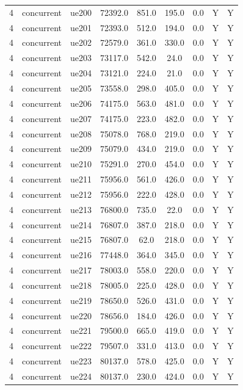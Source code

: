 \begin{table}[ht]
\begin{tabular}{|c|c|c|c|c|c|c|c|c|}
4 & concurrent & ue200 & 72392.0 & 851.0 & 195.0 & 0.0 & Y & Y \\
4 & concurrent & ue201 & 72393.0 & 512.0 & 194.0 & 0.0 & Y & Y \\
4 & concurrent & ue202 & 72579.0 & 361.0 & 330.0 & 0.0 & Y & Y \\
4 & concurrent & ue203 & 73117.0 & 542.0 & 24.0 & 0.0 & Y & Y \\
4 & concurrent & ue204 & 73121.0 & 224.0 & 21.0 & 0.0 & Y & Y \\
4 & concurrent & ue205 & 73558.0 & 298.0 & 405.0 & 0.0 & Y & Y \\
4 & concurrent & ue206 & 74175.0 & 563.0 & 481.0 & 0.0 & Y & Y \\
4 & concurrent & ue207 & 74175.0 & 223.0 & 482.0 & 0.0 & Y & Y \\
4 & concurrent & ue208 & 75078.0 & 768.0 & 219.0 & 0.0 & Y & Y \\
4 & concurrent & ue209 & 75079.0 & 434.0 & 219.0 & 0.0 & Y & Y \\
4 & concurrent & ue210 & 75291.0 & 270.0 & 454.0 & 0.0 & Y & Y \\
4 & concurrent & ue211 & 75956.0 & 561.0 & 426.0 & 0.0 & Y & Y \\
4 & concurrent & ue212 & 75956.0 & 222.0 & 428.0 & 0.0 & Y & Y \\
4 & concurrent & ue213 & 76800.0 & 735.0 & 22.0 & 0.0 & Y & Y \\
4 & concurrent & ue214 & 76807.0 & 387.0 & 218.0 & 0.0 & Y & Y \\
4 & concurrent & ue215 & 76807.0 & 62.0 & 218.0 & 0.0 & Y & Y \\
4 & concurrent & ue216 & 77448.0 & 364.0 & 345.0 & 0.0 & Y & Y \\
4 & concurrent & ue217 & 78003.0 & 558.0 & 220.0 & 0.0 & Y & Y \\
4 & concurrent & ue218 & 78005.0 & 225.0 & 428.0 & 0.0 & Y & Y \\
4 & concurrent & ue219 & 78650.0 & 526.0 & 431.0 & 0.0 & Y & Y \\
4 & concurrent & ue220 & 78656.0 & 184.0 & 426.0 & 0.0 & Y & Y \\
4 & concurrent & ue221 & 79500.0 & 665.0 & 419.0 & 0.0 & Y & Y \\
4 & concurrent & ue222 & 79507.0 & 331.0 & 413.0 & 0.0 & Y & Y \\
4 & concurrent & ue223 & 80137.0 & 578.0 & 425.0 & 0.0 & Y & Y \\
4 & concurrent & ue224 & 80137.0 & 230.0 & 424.0 & 0.0 & Y & Y \\

\end{tabular}
\end{table}
